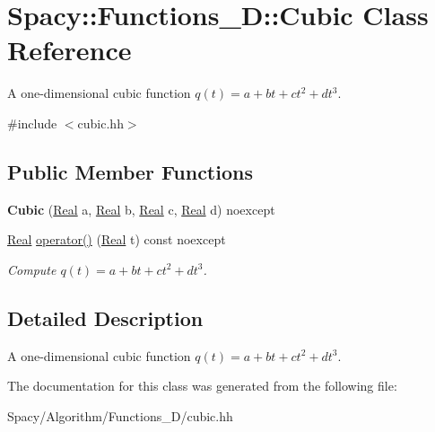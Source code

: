 \hypertarget{classSpacy_1_1Functions__1D_1_1Cubic}{}\section{Spacy\+:\+:Functions\+\_\+D\+:\+:Cubic Class Reference}
\label{classSpacy_1_1Functions__1D_1_1Cubic}


A one-\/dimensional cubic function $q(t) = a + bt + ct^2 + dt^3$.  




{\ttfamily \#include $<$cubic.\+hh$>$}

\subsection*{Public Member Functions}
\begin{DoxyCompactItemize}
\item 
\hypertarget{classSpacy_1_1Functions__1D_1_1Cubic_a02138df0eb7552a66c4d4c4ab1e23771}{}{\bfseries Cubic} (\hyperlink{classSpacy_1_1Real}{Real} a, \hyperlink{classSpacy_1_1Real}{Real} b, \hyperlink{classSpacy_1_1Real}{Real} c, \hyperlink{classSpacy_1_1Real}{Real} d) noexcept\label{classSpacy_1_1Functions__1D_1_1Cubic_a02138df0eb7552a66c4d4c4ab1e23771}

\item 
\hypertarget{classSpacy_1_1Functions__1D_1_1Cubic_adeb72297c0849ada705f61dbe0f1ea61}{}\hyperlink{classSpacy_1_1Real}{Real} \hyperlink{classSpacy_1_1Functions__1D_1_1Cubic_adeb72297c0849ada705f61dbe0f1ea61}{operator()} (\hyperlink{classSpacy_1_1Real}{Real} t) const noexcept\label{classSpacy_1_1Functions__1D_1_1Cubic_adeb72297c0849ada705f61dbe0f1ea61}

\begin{DoxyCompactList}\small\item\em Compute $q(t) = a + bt + ct^2 + dt^3 $. \end{DoxyCompactList}\end{DoxyCompactItemize}


\subsection{Detailed Description}
A one-\/dimensional cubic function $q(t) = a + bt + ct^2 + dt^3$. 

The documentation for this class was generated from the following file\+:\begin{DoxyCompactItemize}
\item 
Spacy/\+Algorithm/\+Functions\+\_\+D/cubic.\+hh\end{DoxyCompactItemize}
